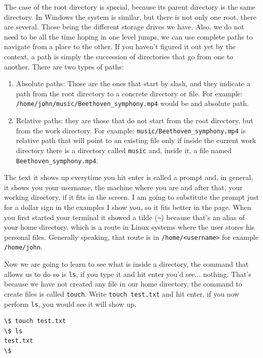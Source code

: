 \documentclass[a4paper]{article}
\begin{document}
The case of the root
directory is special, because its parent directory is the same directory. In
Windows the system is similar, but there is not only one root, there are
several. Those being the different storage drives we have. Also, we do not need
to be all the time hoping in one level jumps, we can use complete paths to
navigate from a place to the other. If you haven't figured it out yet by the
context, a path is simply the succession of directories that go from one to
another. There are two types of paths:
\begin{enumerate}
    \item Absolute paths: Those are the ones that start by slash, and they
    indicate a path from the root directory to a concrete directory or file.
    For example: \verb!/home/john/music/Beethoven_symphony.mp4! would be and
    absolute path.
    \item Relative paths: they are those that do not start from the root
    directory, but from the work directory. For example:
    \verb!music/Beethoven_symphony.mp4! is relative path that will point to
    an existing file only if inside the current work directory there is a
    directory called \verb!music! and, inside it, a file named
    \verb!Beethoven_symphony.mp4!.
\end{enumerate}

The text it shows up everytime you hit enter is called a prompt and, in general,
it shows you your username, the machine where you are and after that, your
working directory, if it fits in the screen. I am going to substitute the prompt
just for a dollar sign in the examples I show you, so it fits better in the
page. When you first started your terminal it showed a tilde (\verb!~!) because
that's an alias of your home directory, which is a route in Linux systems where
the user stores his personal files. Generally speaking, that route is in
\verb!/home/<username>! for example \verb!/home/john!.

Now we are going to learn to see what is inside a directory, the command that
allows us to do so is \verb!ls!, if you type it and hit enter you'd see...
nothing. That's because we have not created any file in our home directory,
the command to create files is called \verb"touch". Write \verb!touch test.txt!
and hit enter, if you now perform \verb!ls!, you would see it will show up.

\noindent
\begin{minipage}[H]{\linewidth}
\mbox{}
\begin{lstlisting}[style=terminalStyle]
\$ touch test.txt
\$ ls
test.txt
\$
\end{lstlisting}
\end{minipage}
\end{document}
